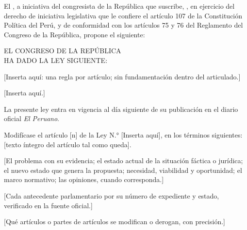 \documentclass{proyecto-de-ley}
\begin{document}
\noindent El , a iniciativa del congresista de la Rep\'ublica que
suscribe, , en ejercicio del derecho de iniciativa legislativa
que le confiere el art\'iculo 107 de la Constituci\'on Pol\'itica del Per\'u, y de
conformidad con los art\'iculos 75 y 76 del Reglamento del Congreso de la
Rep\'ublica, propone el siguiente:


\begin{center}{\seriesemi EL CONGRESO DE LA REP\'UBLICA\\ HA DADO LA LEY SIGUIENTE:}\end{center}

[Inserta aqu\'i: una regla por art\'iculo; sin fundamentaci\'on dentro del articulado.]

[Inserta aqu\'i.]

La presente ley entra en vigencia al d\'ia siguiente de su publicaci\'on en el
diario oficial \emph{El Peruano}.

Modif\'icase el art\'iculo [n] de la Ley N.° [Inserta aqu\'i], en los t\'erminos
siguientes: [texto \'integro del art\'iculo tal como queda].

\firmaslegislativas


[El problema con su evidencia; el estado actual de la situaci\'on f\'actica o
jur\'idica; el nuevo estado que genera la propuesta; necesidad, viabilidad y
oportunidad; el marco normativo; las opiniones, cuando corresponda.]

[Cada antecedente parlamentario por su n\'umero de expediente y estado,
verificado en la fuente oficial.]

[Qu\'e art\'iculos o partes de art\'iculos se modifican o derogan, con precisi\'on.]
\end{document}
